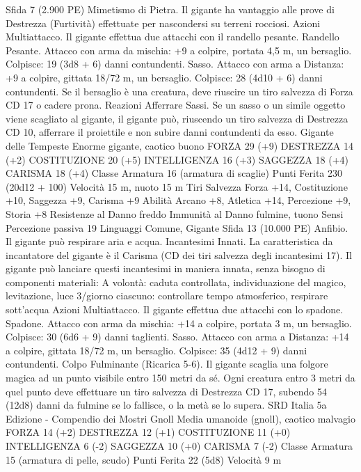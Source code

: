 \begin{multicols}{2}
Sfida 7 (2.900 PE)
Mimetismo di Pietra. Il gigante ha vantaggio alle prove di Destrezza
(Furtività) effettuate per nascondersi su terreni rocciosi.
Azioni
Multiattacco. Il gigante effettua due attacchi con il randello pesante.
Randello Pesante. Attacco con arma da mischia: +9 a colpire,
portata 4,5 m, un bersaglio.
Colpisce: 19 (3d8 + 6) danni contundenti.
Sasso. Attacco con arma a Distanza: +9 a colpire, gittata 18/72
m, un bersaglio.
Colpisce: 28 (4d10 + 6) danni contundenti. Se il bersaglio è una
creatura, deve riuscire un tiro salvezza di Forza CD 17 o cadere
prona.
Reazioni
Afferrare Sassi. Se un sasso o un simile oggetto viene scagliato al
gigante, il gigante può, riuscendo un tiro salvezza di Destrezza CD
10, afferrare il proiettile e non subire danni contundenti da esso.
Gigante delle Tempeste
Enorme gigante, caotico buono
FORZA 29 (+9)
DESTREZZA 14 (+2)
COSTITUZIONE 20 (+5)
INTELLIGENZA 16 (+3)
SAGGEZZA 18 (+4)
CARISMA 18 (+4)
Classe Armatura 16 (armatura di scaglie)
Punti Ferita 230 (20d12 + 100)
Velocità 15 m, nuoto 15 m
Tiri Salvezza Forza +14, Costituzione +10, Saggezza +9,
Carisma +9
Abilità Arcano +8, Atletica +14, Percezione +9, Storia +8
Resistenze al Danno freddo
Immunità al Danno fulmine, tuono
Sensi Percezione passiva 19
Linguaggi Comune, Gigante
Sfida 13 (10.000 PE)
Anfibio. Il gigante può respirare aria e acqua.
Incantesimi Innati. La caratteristica da incantatore del gigante è
il Carisma (CD dei tiri salvezza degli incantesimi 17). Il gigante
può lanciare questi incantesimi in maniera innata, senza bisogno
di componenti materiali:
A volontà: caduta controllata, individuazione del magico,
levitazione, luce
3/giorno ciascuno: controllare tempo atmosferico, respirare
sott'acqua
Azioni
Multiattacco. Il gigante effettua due attacchi con lo spadone.
Spadone. Attacco con arma da mischia: +14 a colpire, portata 3
m, un bersaglio.
Colpisce: 30 (6d6 + 9) danni taglienti.
Sasso. Attacco con arma a Distanza: +14 a colpire, gittata 18/72
m, un bersaglio.
Colpisce: 35 (4d12 + 9) danni contundenti.
Colpo Fulminante (Ricarica 5-6). Il gigante scaglia una folgore
magica ad un punto visibile entro 150 metri da sé. Ogni creatura
entro 3 metri da quel punto deve effettuare un tiro salvezza di
Destrezza CD 17, subendo 54 (12d8) danni da fulmine se lo
fallisce, o la metà se lo supera.
SRD Italia 5a Edizione - Compendio dei Mostri
Gnoll
Media umanoide (gnoll), caotico malvagio
FORZA 14 (+2)
DESTREZZA 12 (+1)
COSTITUZIONE 11 (+0)
INTELLIGENZA 6 (-2)
SAGGEZZA 10 (+0)
CARISMA 7 (-2)
Classe Armatura 15 (armatura di pelle, scudo)
Punti Ferita 22 (5d8)
Velocità 9 m

\end{multicols}
